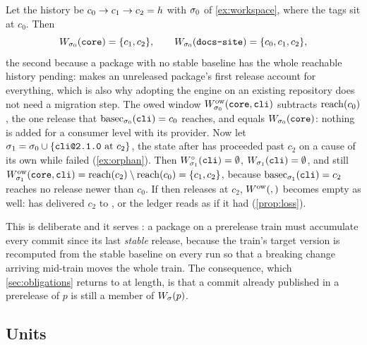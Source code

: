 \begin{example}[windows]
\label{ex:window}
Let the history be $c_0 \to c_1 \to c_2 = h$ with $\sigma_0$ of
\cref{ex:workspace}, where the tags sit at $c_0$. Then
\[
  W_{\sigma_0}(\texttt{core}) = \{c_1, c_2\},
  \qquad
  W_{\sigma_0}(\texttt{docs-site}) = \{c_0, c_1, c_2\},
\]
the second because a package with no stable baseline has the whole reachable
history pending:  makes an unreleased package's first release
account for everything, which is also why adopting the engine on an existing
repository does not need a migration step. The owed window
$W^{\mathrm{ow}}_{\sigma_0}(\texttt{core},\texttt{cli})$ subtracts $\mathrm{reach}(c_0)$, the one
 release that $\mathrm{basec}_{\sigma_0}(\texttt{cli}) = c_0$ reaches, and equals
$W_{\sigma_0}(\texttt{core})$: nothing is added for a consumer level with its
provider. Now let $\st_1 = \st_0 \cup \{\code{cli@2.1.0}\ \text{at}\ c_2\}$,
the state after  has proceeded past $c_2$ on a cause of its own
while  failed (\cref{ex:orphan}). Then $W^{\circ}_{\sigma_1}(\texttt{cli}) =
\emptyset$, $W_{\sigma_1}(\texttt{cli}) = \emptyset$, and still
$W^{\mathrm{ow}}_{\sigma_1}(\texttt{core},\texttt{cli}) = \mathrm{reach}(c_2)\setminus\mathrm{reach}(c_0) =
\{c_1, c_2\}$, because $\mathrm{basec}_{\sigma_1}(\texttt{cli}) = c_2$ reaches no
 release newer than $c_0$. If  then releases at
$c_2$, $W^{\mathrm{ow}}_{}(,)$ becomes empty as well:  has delivered $c_2$
to , or the ledger reads as if it had (\cref{prop:loss}).
\end{example}

\begin{remark}
\label{rem:stable-window}
This is deliberate and it serves : a package on a prerelease train
must accumulate every commit since its last \emph{stable} release, because the
train's target version is recomputed from the stable baseline on every run so
that a breaking change arriving mid-train moves the whole train. The
consequence, which \cref{sec:obligations} returns to at length, is that a
commit already published in a prerelease of $p$ is still a member of
$W_{\sigma}(p)$.
\end{remark}

\subsection{Units}

